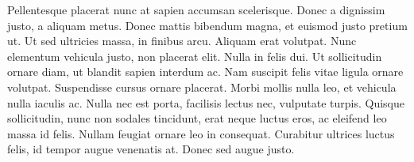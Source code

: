 \documentclass[conference]{IEEEtran}
\begin{document}
  Pellentesque placerat nunc at sapien accumsan scelerisque. Donec a dignissim justo, a aliquam metus. Donec mattis bibendum magna, et euismod justo pretium ut. Ut sed ultricies massa, in finibus arcu. Aliquam erat volutpat. Nunc elementum vehicula justo, non placerat elit. Nulla in felis dui. Ut sollicitudin ornare diam, ut blandit sapien interdum ac. Nam suscipit felis vitae ligula ornare volutpat. Suspendisse cursus ornare placerat. Morbi mollis nulla leo, et vehicula nulla iaculis ac. Nulla nec est porta, facilisis lectus nec, vulputate turpis. Quisque sollicitudin, nunc non sodales tincidunt, erat neque luctus eros, ac eleifend leo massa id felis. Nullam feugiat ornare leo in consequat. Curabitur ultrices luctus felis, id tempor augue venenatis at. Donec sed augue justo.
  
  \newpage

  
  
\end{document}
